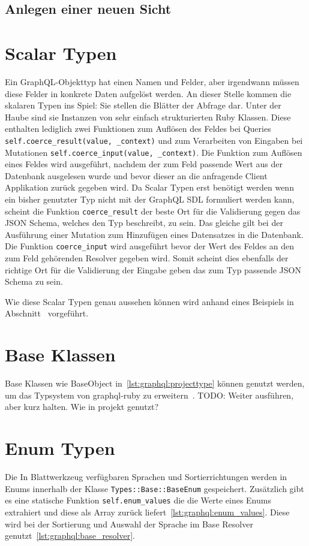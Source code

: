 \subsection{Anlegen einer neuen Sicht}


\section{Scalar Typen}
\label{graphql:scalartypes}
Ein GraphQL-Objekttyp hat einen Namen und Felder, aber irgendwann müssen diese Felder in konkrete Daten aufgelöst werden. An dieser Stelle kommen die skalaren Typen ins Spiel: Sie stellen die Blätter der Abfrage dar. 
Unter der Haube sind sie Instanzen von sehr einfach strukturierten Ruby Klassen. Diese enthalten lediglich zwei Funktionen zum Auflösen des Feldes bei Queries \lstinline|self.coerce_result(value, _context)| und zum Verarbeiten von Eingaben bei Mutationen \lstinline|self.coerce_input(value, _context)|. Die Funktion zum Auflösen eines Feldes wird ausgeführt, nachdem der zum Feld passende Wert aus der Datenbank ausgelesen wurde und bevor dieser an die anfragende Client Applikation zurück gegeben wird. Da Scalar Typen erst benötigt werden wenn ein bisher genutzter Typ nicht mit der GraphQL SDL formuliert werden kann, scheint die Funktion \lstinline|coerce_result| der beste Ort für die Validierung gegen das JSON Schema, welches den Typ beschreibt, zu sein. Das gleiche gilt bei der Ausführung einer Mutation zum Hinzufügen eines Datensatzes in die Datenbank. Die Funktion \lstinline|coerce_input| wird ausgeführt bevor der Wert des Feldes an den zum Feld gehörenden Resolver gegeben wird. Somit scheint dies ebenfalls der richtige Ort für die Validierung der Eingabe geben das zum Typ passende JSON Schema zu sein.

Wie diese Scalar Typen genau aussehen können wird anhand eines Beispiels in Abschnitt~ vorgeführt.

\section{Base Klassen}
\label{graphql:baseclass}
Base Klassen wie BaseObject in~\ref{lst:graphql:projecttype} können genutzt werden, um das Typsystem von graphql-ruby zu erweitern~\cite{graphql-extending}. 
TODO: Weiter ausführen, aber kurz halten. Wie in projekt genutzt?

\section{Enum Typen}
\label{graphql:enumtypes}
Die In Blattwerkzeug verfügbaren Sprachen und Sortierrichtungen werden in Enums innerhalb der Klasse \lstinline|Types::Base::BaseEnum| gespeichert. Zusätzlich gibt es eine statische Funktion \lstinline|self.enum_values| die die Werte eines Enums extrahiert und diese als Array zurück liefert~\ref{lst:graphql:enum_values}. Diese wird bei der Sortierung und Auswahl der Sprache im Base Resolver genutzt~\ref{lst:graphql:base_resolver}.

